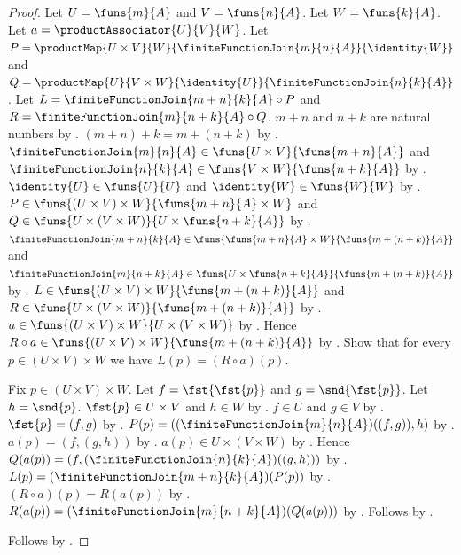 \begin{proof}
    Let $U=\funs{m}{A}$ and $V=\funs{n}{A}$.
    Let $W=\funs{k}{A}$.
    Let $a=\productAssociator{U}{V}{W}$.
    Let $P=\productMap{U\times V}{W}{\finiteFunctionJoin{m}{n}{A}}{\identity{W}}$ and
        $Q=\productMap{U}{V\times W}{\identity{U}}{\finiteFunctionJoin{n}{k}{A}}$.
    Let $L=\finiteFunctionJoin{m+n}{k}{A}\circ P$ and
        $R=\finiteFunctionJoin{m}{n+k}{A}\circ Q$.
    $m+n$ and $n+k$ are natural numbers by .
    $(m+n)+k=m+(n+k)$ by .
    $\finiteFunctionJoin{m}{n}{A}\in\funs{U\times V}{\funs{m+n}{A}}$ and
        $\finiteFunctionJoin{n}{k}{A}\in\funs{V\times W}{\funs{n+k}{A}}$ by
        .
    $\identity{U}\in\funs{U}{U}$ and $\identity{W}\in\funs{W}{W}$ by .
    $P\in\funs{(U\times V)\times W}{\funs{m+n}{A}\times W}$ and
        $Q\in\funs{U\times(V\times W)}{U\times\funs{n+k}{A}}$ by
        .
    $\finiteFunctionJoin{m+n}{k}{A}\in
        \funs{\funs{m+n}{A}\times W}{\funs{m+(n+k)}{A}}$ and
        $\finiteFunctionJoin{m}{n+k}{A}\in
        \funs{U\times\funs{n+k}{A}}{\funs{m+(n+k)}{A}}$ by
        .
    $L\in\funs{(U\times V)\times W}{\funs{m+(n+k)}{A}}$ and
        $R\in\funs{U\times(V\times W)}{\funs{m+(n+k)}{A}}$ by .
    $a\in\funs{(U\times V)\times W}{U\times(V\times W)}$ by .
    Hence $R\circ a\in\funs{(U\times V)\times W}{\funs{m+(n+k)}{A}}$ by .
    Show that for every $p\in(U\times V)\times W$ we have $L(p)=(R\circ a)(p)$.
    \begin{subproof}
        Fix $p\in(U\times V)\times W$.
        Let $f=\fst{\fst{p}}$ and $g=\snd{\fst{p}}$.
        Let $h=\snd{p}$.
        $\fst{p}\in U\times V$ and $h\in W$ by .
        $f\in U$ and $g\in V$ by .
        $\fst{p}=(f,g)$ by .
        $P(p)=((\finiteFunctionJoin{m}{n}{A})((f,g)),h)$ by
            .
        $a(p)=(f,(g,h))$ by .
        $a(p)\in U\times(V\times W)$ by .
        Hence $Q(a(p))=(f,(\finiteFunctionJoin{n}{k}{A})((g,h)))$ by
            .
        $L(p)=(\finiteFunctionJoin{m+n}{k}{A})(P(p))$ by
            .
        $(R\circ a)(p)=R(a(p))$ by .
        $R(a(p))=(\finiteFunctionJoin{m}{n+k}{A})(Q(a(p)))$ by
            .
        Follows by .
    \end{subproof}
    Follows by .
\end{proof}

